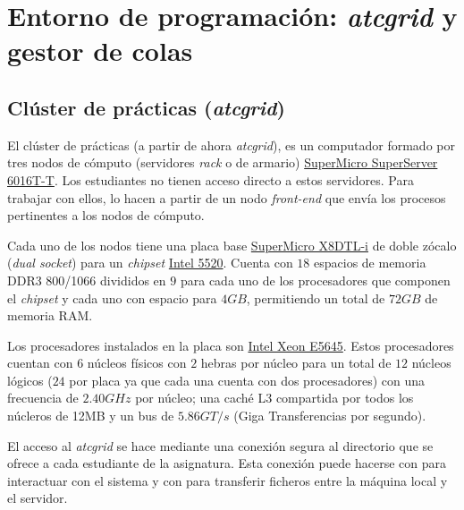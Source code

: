 \chapter{Entorno de programación: \textit{atcgrid} y gestor de colas}

\section{Clúster de prácticas (\textit{atcgrid})}

El clúster de prácticas (a partir de ahora \textit{atcgrid}), es un computador formado por tres nodos de cómputo (servidores \textit{rack} o de armario) \href{https://www.supermicro.com/products/system/1U/6016/SYS-6016T-T.cfm}{SuperMicro SuperServer 6016T-T}.
Los estudiantes no tienen acceso directo a estos servidores.
Para trabajar con ellos, lo hacen a partir de un nodo \textit{front-end} que envía los procesos pertinentes a los nodos de cómputo.

Cada uno de los nodos tiene una placa base \href{www.supermicro.com/products/motherboard/QPI/5500/X8DTL-i.cfm}{SuperMicro X8DTL-i} de doble zócalo (\textit{dual socket}) para un \textit{chipset} \href{https://www.intel.com/content/www/us/en/design/products-and-solutions/processors-and-chipsets/tylersburg/technical-library.html}{Intel 5520}.
Cuenta con $18$ espacios de memoria DDR3 800/1066 divididos en $9$ para cada uno de los procesadores que componen el \textit{chipset} y cada uno con espacio para $4GB$, permitiendo un total de $72GB$ de memoria RAM\@.

Los procesadores instalados en la placa son \href{https://ark.intel.com/content/www/us/en/ark/products/48768/intel-xeon-processor-e5645-12m-cache-2-40-ghz-5-86-gt-s-intel-qpi.html}{Intel Xeon E5645}.
Estos procesadores cuentan con $6$ núcleos físicos con $2$ hebras por núcleo para un total de $12$ núcleos lógicos ($24$ por placa ya que cada una cuenta con dos procesadores) con una frecuencia de $2.40GHz$ por núcleo; una caché L3 compartida por todos los núcleros de 12MB y un bus de $5.86GT/s$ (Giga Transferencias por segundo).

El acceso al \textit{atcgrid} se hace mediante una conexión segura al directorio  que se ofrece a cada estudiante de la asignatura.
Esta conexión puede hacerse con  para interactuar con el sistema y con  para transferir ficheros entre la máquina local y el servidor.

\subsection{}

